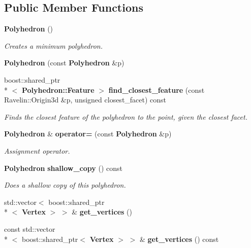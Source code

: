 \subsection*{Public Member Functions}
\begin{DoxyCompactItemize}
\item 
{\bf Polyhedron} ()\label{classMoby_1_1Polyhedron_aebdf7ee85eb636069bf93afb4e6a483f}

\begin{DoxyCompactList}\small\item\em Creates a minimum polyhedron. \end{DoxyCompactList}\item 
{\bfseries Polyhedron} (const {\bf Polyhedron} \&p)\label{classMoby_1_1Polyhedron_a78d58f579539183b64839e85a7886c7f}

\item 
boost\-::shared\-\_\-ptr\\*
$<$ {\bf Polyhedron\-::\-Feature} $>$ {\bf find\-\_\-closest\-\_\-feature} (const Ravelin\-::\-Origin3d \&p, unsigned closest\-\_\-facet) const 
\begin{DoxyCompactList}\small\item\em Finds the closest feature of the polyhedron to the point, given the closest facet. \end{DoxyCompactList}\item 
{\bf Polyhedron} \& {\bf operator=} (const {\bf Polyhedron} \&p)\label{classMoby_1_1Polyhedron_a4cee7a5bf6546f2d6c4a0904f005a40a}

\begin{DoxyCompactList}\small\item\em Assignment operator. \end{DoxyCompactList}\item 
{\bf Polyhedron} {\bf shallow\-\_\-copy} () const \label{classMoby_1_1Polyhedron_a649f6aa1c7f3707e955be1544751c4ea}

\begin{DoxyCompactList}\small\item\em Does a shallow copy of this polyhedron. \end{DoxyCompactList}\item 
std\-::vector$<$ boost\-::shared\-\_\-ptr\\*
$<$ {\bf Vertex} $>$ $>$ \& {\bfseries get\-\_\-vertices} ()\label{classMoby_1_1Polyhedron_ade11893c4a4825958f0a21fc3cfa587f}

\item 
const std\-::vector\\*
$<$ boost\-::shared\-\_\-ptr$<$ {\bf Vertex} $>$ $>$ \& {\bfseries get\-\_\-vertices} () const \label{classMoby_1_1Polyhedron_a43576df898c75c40c036fdffba2d97fe}


\end{DoxyCompactItemize}
